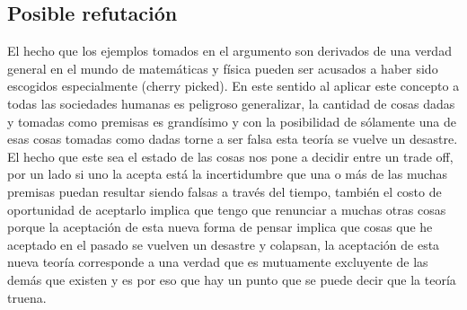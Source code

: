 \documentclass{article}
\begin{document}
\subsection{Posible refutación}
El hecho que los ejemplos tomados en el argumento son derivados de una verdad general en el mundo de matemáticas y física pueden ser acusados a haber sido escogidos especialmente (cherry picked). En este sentido al aplicar este concepto a todas las sociedades humanas es peligroso generalizar, la cantidad de cosas dadas y tomadas como premisas es grandísimo y con la posibilidad de sólamente una de esas cosas tomadas como dadas torne a ser falsa esta teoría se vuelve un desastre. El hecho que este sea el estado de las cosas nos pone a decidir entre un trade off, por un lado si uno la acepta está la incertidumbre que una o más de las muchas premisas puedan resultar siendo falsas a través del tiempo, también el costo de oportunidad de aceptarlo implica que tengo que renunciar a muchas otras cosas porque la aceptación de esta nueva forma de pensar implica que cosas que he aceptado en el pasado se vuelven un desastre y colapsan, la aceptación de esta nueva teoría corresponde a una verdad que es mutuamente excluyente de las demás que existen y es por eso que hay un punto que se puede decir que la teoría truena.

\end{document}
